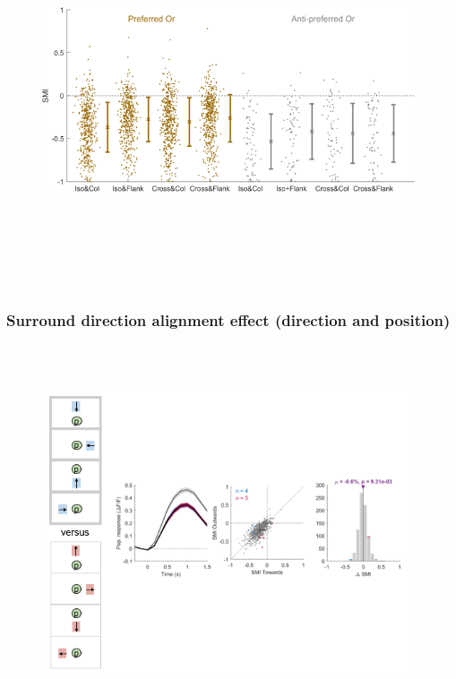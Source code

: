 \begin{figure}[H] \centering \includegraphics[width=11cm,height=11cm,keepaspectratio]{Figures/7.Results/finalPopulation/sel/popPlots_VisROIs_COS_2SalignmentAngle.png} 
\end{figure}

\subsubsection{Surround direction alignment effect (direction and position)}

\begin{figure}[H] \centering \includegraphics[width=11cm,height=11cm,keepaspectratio]{Figures/7.Results/finalPopulation/sel/diagrams/17.png} 
\end{figure}

